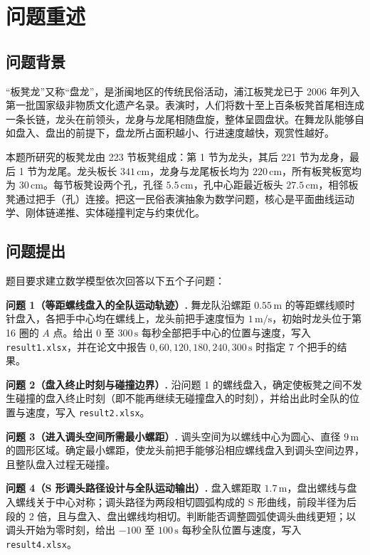 \documentclass[a4paper, 12pt]{ctexart}
\begin{document}
\section{问题重述}

\subsection{问题背景}

“板凳龙”又称“盘龙”，是浙闽地区的传统民俗活动，浦江板凳龙已于 2006 年列入第一批国家级非物质文化遗产名录\cite{ihchina_pujiangloong}。表演时，人们将数十至上百条板凳首尾相连成一条长链，龙头在前领头，龙身与龙尾相随盘旋，整体呈圆盘状。在舞龙队能够自如盘入、盘出的前提下，盘龙所占面积越小、行进速度越快，观赏性越好。

本题所研究的板凳龙由 223 节板凳组成：第 1 节为龙头，其后 221 节为龙身，最后 1 节为龙尾。龙头板长 $341\,\mathrm{cm}$，龙身与龙尾板长均为 $220\,\mathrm{cm}$，所有板凳板宽均为 $30\,\mathrm{cm}$。每节板凳设两个孔，孔径 $5.5\,\mathrm{cm}$，孔中心距最近板头 $27.5\,\mathrm{cm}$，相邻板凳通过把手（孔）连接。把这一民俗表演抽象为数学问题，核心是平面曲线运动学、刚体链递推、实体碰撞判定与约束优化。

\subsection{问题提出}

题目要求建立数学模型依次回答以下五个子问题：

\noindent\textbf{问题 1（等距螺线盘入的全队运动轨迹）.} 舞龙队沿螺距 $0.55\,\mathrm{m}$ 的等距螺线顺时针盘入，各把手中心均在螺线上，龙头前把手速度恒为 $1\,\mathrm{m/s}$，初始时龙头位于第 16 圈的 $A$ 点。给出 $0$ 至 $300\,\mathrm{s}$ 每秒全部把手中心的位置与速度，写入 \texttt{result1.xlsx}，并在论文中报告 $0,60,120,180,240,300\,\mathrm{s}$ 时指定 7 个把手的结果。

\noindent\textbf{问题 2（盘入终止时刻与碰撞边界）.} 沿问题 1 的螺线盘入，确定使板凳之间不发生碰撞的盘入终止时刻（即不能再继续无碰撞盘入的时刻），并给出此时全队的位置与速度，写入 \texttt{result2.xlsx}。

\noindent\textbf{问题 3（进入调头空间所需最小螺距）.} 调头空间为以螺线中心为圆心、直径 $9\,\mathrm{m}$ 的圆形区域。确定最小螺距，使龙头前把手能够沿相应螺线盘入到调头空间边界，且整队盘入过程无碰撞。

\noindent\textbf{问题 4（S 形调头路径设计与全队运动输出）.} 盘入螺距取 $1.7\,\mathrm{m}$，盘出螺线与盘入螺线关于中心对称；调头路径为两段相切圆弧构成的 S 形曲线，前段半径为后段的 2 倍，且与盘入、盘出螺线均相切。判断能否调整圆弧使调头曲线更短；以调头开始为零时刻，给出 $-100$ 至 $100\,\mathrm{s}$ 每秒全队位置与速度，写入 \texttt{result4.xlsx}。
\end{document}
